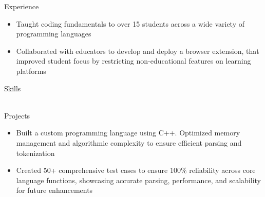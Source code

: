 \documentclass{resume}
\begin{document}
\begin{experienceSection}{Experience}
    \experienceItem[
        company={theCoderSchool},
        location={Berkeley Heights, NJ},
        position={Code Tutor},
        duration={March 2024 - August 2024}
    ]
    \begin{itemize}[itemsep=-6pt, leftmargin=1.2em, rightmargin=0.8em, before=\raggedright, after=\normalfont]
        \item Taught coding fundamentals to over 15 students across a wide variety of programming languages
        \item Collaborated with educators to develop and deploy a browser extension, that improved student focus by restricting non-educational features on learning platforms
    \end{itemize}

\end{experienceSection}

\begin{skillsSection}{Skills}
    \skillItem[
        category={Languages},
        skills={Python, C, C++, JavaScript, TypeScript, Java, PHP, SQL}
    ] \\
    \skillItem[
        category={Full-Stack Development},
        skills={React, Next.js, Vue, Node.js, MongoDB, Zustand, Tailwind}
    ] \\
    \skillItem[
        category={DevOps \& Tooling},
        skills={AWS, EKS, ECR, Terraform, ArgoCD, CircleCI, Linux/Unix, Git, Bash}
    ]
\end{skillsSection}

\begin{experienceSection}{Projects}
    \projectItem[
        title={Mini C-Like Programming Language},
    ]
    \vspace{-0.5em}
    \begin{itemize}[topsep=0pt, itemsep=-6pt, leftmargin=1.2em, rightmargin=0.8em, before=\raggedright, after=\normalfont]
        \item Built a custom programming language using C++. Optimized memory management and algorithmic complexity to ensure efficient parsing and tokenization
        \item Created 50+ comprehensive test cases to ensure 100\% reliability across core language functions, showcasing accurate parsing, performance, and scalability for future enhancements
    \end{itemize}
\end{experienceSection}
\end{document}
